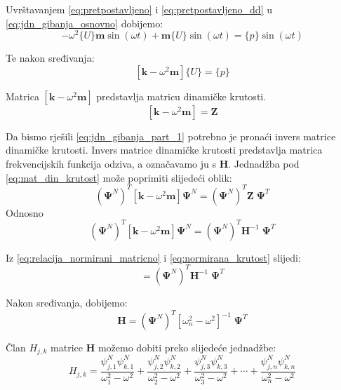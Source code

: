 \documentclass{rgn}
\newcommand\mm{\mathbf{m}}
\newcommand\kk{\mathbf{k}}
\newcommand\ppsi{\mathbf{\Psi}}
\begin{document}
Uvrštavanjem \eqref{eq:pretpostavljeno} i \eqref{eq:pretpostavljeno_dd} u
\eqref{eq:jdn_gibanja_osnovno} dobijemo:
\begin{equation}
    -\omega^2\{U\}\mm\sin(\omega t) + \mm\{U\}\sin(\omega t) = \{p\}\sin(\omega t)
\end{equation}

Te nakon sređivanja:
\begin{equation}\label{eq:jdn_gibanja_part_1}
    [\kk-\omega^2\mm]\{U\}=\{p\}
\end{equation}

Matrica $[\kk-\omega^2\mm]$ predstavlja matricu dinamičke krutosti.
\begin{equation}\label{eq:mat_din_krutost}
    [\kk-\omega^2\mm]=\mathbf{Z}
\end{equation}

Da bismo rješili \eqref{eq:jdn_gibanja_part_1} potrebno je pronaći invers matrice
dinamičke krutosti. Invers matrice dinamičke krutosti predstavlja matrica
frekvencijskih funkcija odziva, a označavamo ju s $\mathbf{H}$. Jednadžba pod 
\eqref{eq:mat_din_krutost} može poprimiti slijedeći oblik:
\begin{equation}
    \left(\ppsi^N\right)^T[\kk-\omega^2\mm]\ppsi^N
    =
    \left(\ppsi^N\right)^T\mathbf{Z}\;\ppsi^T
\end{equation}
Odnosno
\begin{equation}
     \left(\ppsi^N\right)^T[\kk-\omega^2\mm]\ppsi^N
    =
    \left(\ppsi^N\right)^T\mathbf{H}^{-1}\;\ppsi^T
\end{equation}

Iz \eqref{eq:relacija_normirani_matricno} i \eqref{eq:normirana_krutost} slijedi:
\begin{equation}
    [\omega_n^2 - \omega^2] = \left(\ppsi^N\right)^T\mathbf{H}^{-1}\;\ppsi^T
\end{equation}

Nakon sređivanja, dobijemo:
\begin{equation}
    \mathbf{H}=\left(\ppsi^N\right)^T[\omega_n^2 - \omega^2]^{-1}\;\ppsi^T
\end{equation}

Član $H_{j,k}$ matrice $\mathbf{H}$ možemo dobiti preko slijedeće jednadžbe:
\begin{equation}\label{eq:clan_frf_matrice}
    H_{j,k}=\frac{\psi^N_{j,1}\psi^N_{k,1}}{\omega_1^2-\omega^2}
            +
            \frac{\psi^N_{j,2}\psi^N_{k,2}}{\omega_2^2-\omega^2}
            +
            \frac{\psi^N_{j,3}\psi^N_{k,3}}{\omega_3^2-\omega^2}
            +
            \cdots
            +
            \frac{\psi^N_{j,n}\psi^N_{k,n}}{\omega_n^2-\omega^2}
\end{equation}
\end{document}
